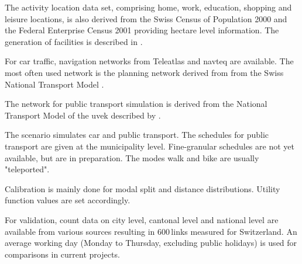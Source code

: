 The activity location data set, comprising home, work, education, shopping and leisure locations, is also derived from the Swiss Census of Population 2000 and the Federal Enterprise Census 2001 \citep[][]{SwissEnterpriseCensus_manual_2001} providing hectare level information. The generation of facilities is described in \citet[][p.33]{BalmerEtAl_ResRep_bdktzrh_2009}.

For car traffic, navigation networks from Teleatlas \citep[][]{MultiNet_Webpage_2010} and \gls{navteq} \citep[][]{Navteq_2011} are available. The most often used network is the planning network derived from from the Swiss National Transport Model \citep[][]{VrticEtAl_BiegerEtAl_2003}.

The network for public transport simulation is derived from the National Transport Model of the \gls{uvek} described by \citet[][]{VrticFroehlich_ResRep_UVEK_2010}. 

The scenario simulates car and public transport. The schedules for public transport are given at the municipality level. Fine-granular schedules are not yet available, but are in preparation. The modes walk and bike are usually "teleported". 

Calibration is mainly done for modal split and distance distributions. Utility function values are set accordingly.

For validation, count data on city level, cantonal level and national level \citep[][]{ASTRA_Webpage_2006} are available from various sources resulting in 600\,links measured for Switzerland. An average working day (Monday to Thursday, excluding public holidays) is used for comparisons in current projects.

